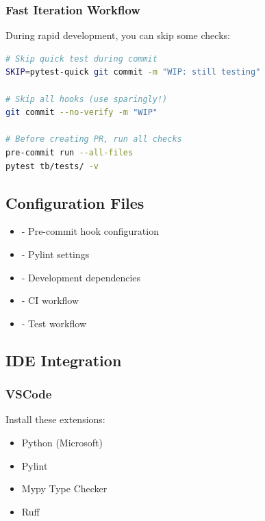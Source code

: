 \subsubsection{Fast Iteration Workflow}\label{um:guide:local-qa:fast-iteration-workflow}

During rapid development, you can skip some checks:

\begin{lstlisting}[language=bash]
# Skip quick test during commit
SKIP=pytest-quick git commit -m "WIP: still testing"

# Skip all hooks (use sparingly!)
git commit --no-verify -m "WIP"

# Before creating PR, run all checks
pre-commit run --all-files
pytest tb/tests/ -v
\end{lstlisting}

\subsection{Configuration Files}\label{um:guide:local-qa:configuration-files}

\begin{itemize}
\tightlist
\item
   - Pre-commit hook configuration
\item
   - Pylint settings
\item
   - Development dependencies
\item
   - CI workflow
\item
   - Test workflow
\end{itemize}

\subsection{IDE Integration}\label{um:guide:local-qa:ide-integration}

\subsubsection{VSCode}\label{um:guide:local-qa:vscode}

Install these extensions:

\begin{itemize}
\tightlist
\item
  Python (Microsoft)
\item
  Pylint
\item
  Mypy Type Checker
\item
  Ruff
\end{itemize}

